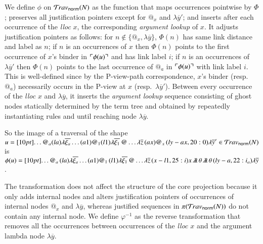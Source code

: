 \documentclass{elsarticle}
\newif\iflongversion
\theoremstyle{plain}
\theoremstyle{definition}
\newcommand{\ghostlmd}{{\lambda\!\!\lambda}}
\newcommand{\ghostvar}{\theta}
\newcommand{\normalizing}{{\sf norm}}
\newcommand{\travsetnorm}{\travset_\normalizing} %
\def\coresymbol{\pi} %
\newcommand\bulklambda[1]{{\lambda\overline{#1}}}
\begin{document}
We define $\phi$ on $\travsetnorm(N)$
as the function that maps occurrences pointwise by $\Phi$;
preserves all justification pointers except
for $@_x$ and $\lambda\overline{y}'$;
and inserts after each occurrence of the \emph{lloc} $x$, the corresponding \emph{argument lookup} of $x$.
It adjusts justification pointers as follows:
for $n\not\in \{ @_x, \lambda\overline{y} \}$, $\Phi(n)$ has same link distance and label as $n$;
if $n$ is an occurrences of $x$ then $\Phi(n)$ points to the first occurrence of $x$'s binder in $\ulcorner \phi(u) \urcorner$ and has link label $i$;
if $n$ is an occurrences of $\lambda\overline{y}'$ then  $\Phi(n)$ points to the last occurrence of $@_a$ in $\ulcorner \phi(u) \urcorner$ with link label $i$.
This is well-defined since by the P-view-path correspondence, $x$'s binder (resp.~$@_a$) necessarily occurs in the P-view at $x$ (resp.~$\lambda\overline{y}'$).
%
Between every occurrence of the \emph{lloc} $x$ and $\lambda\overline{y}$,
it inserts the \emph{argument lookup} sequence consisting of ghost
nodes statically determined by the term tree and obtained by repeatedly instantiating rules  and  until reaching node $\lambda\overline{y}$.
%
\iflongversion
So given a traversal $u \in \travset(N)$ involving $@_x$, $\phi(u)$ is given by:
\begin{eqnarray*}
    u &=& \Pstr[10pt]{ \ldots (aa){@_a} \cdot (la){\bulklambda{\xi_a}} \cdot \ldots (a1){@_1} \cdot (l1){\bulklambda{\xi_1}} \cdot @ \ldots \bulklambda{z} \cdot (ax){@_x} \cdot (ly-ax,20:0){\bulklambda{y}'} }
    \\
    \phi(u) &=& \Pstr[10pt]{ \ldots (aa){@_a} \cdot (la){\bulklambda{\xi_a}} \cdot \ldots (a1){@_1} \cdot (l1){\bulklambda{\xi_1}} \cdot @ \ldots \bulklambda{z} \cdot (x-l1,30:i) x \cdot \ghostlmd \cdot \ghostvar \ldots \ghostlmd \cdot \ghostvar \cdot (ly-a,20:i_a){\bulklambda{y}} }
\end{eqnarray*}
\else
So the image of a traversal of the shape
$u = \Pstr[10pt]{ \ldots @_a (la){\bulklambda{\xi_a}}
  \ldots (a1){@_1} (l1){\bulklambda{\xi_1}} \, @ \ldots \bulklambda{z} \, (ax){@_x} \, (ly-ax,20:0){\bulklambda{y}'} } \in \travsetnorm(N)$
is
$\phi(u) = \Pstr[10pt]{ \ldots @_a \, (la){\bulklambda{\xi_a}}
\ldots (a1){@_1} \, (l1){\bulklambda{\xi_1}} \, @ \ldots \bulklambda{z} \, (x-l1,25:i) x \, \ghostlmd \, \ghostvar \, \ghostlmd \, \ghostvar \, (ly-a,22:i_a){\bulklambda{y}}}$.
\fi
The transformation does not affect the structure
of the core projection
because it only adds internal nodes and alters justification pointers of occurrences of internal nodes $@_x$ and $\lambda\overline y$,
whereas justified sequences in $\coresymbol(\travsetnorm(N))$ do not contain any internal node.
%
We define $\varphi^{-1}$ as the reverse transformation
that removes all the occurrences between occurrences of the \emph{lloc} $x$ and the  argument lambda node $\lambda\overline{y}$.
\end{document}
